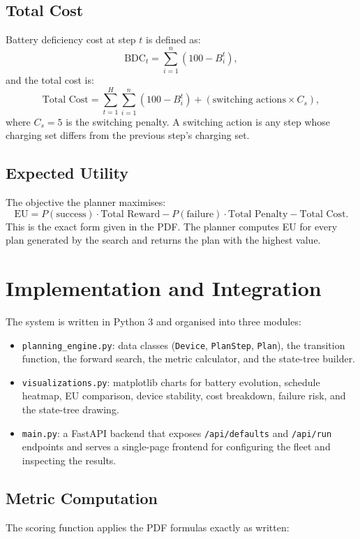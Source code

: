 \documentclass[11pt,a4paper]{article}
\begin{document}
\subsection*{Total Cost}
Battery deficiency cost at step $t$ is defined as:
\[
    \text{BDC}_t = \sum_{i=1}^{n} (100 - B_i^{t}),
\]
and the total cost is:
\[
    \text{Total Cost} = \sum_{t=1}^{H} \sum_{i=1}^{n} (100 - B_i^{t})
                      + (\text{switching actions} \times C_s),
\]
where $C_s = 5$ is the switching penalty. A switching action is any step whose
charging set differs from the previous step's charging set.

\subsection*{Expected Utility}
The objective the planner maximises:
\[
    \text{EU} = P(\text{success}) \cdot \text{Total Reward}
              - P(\text{failure}) \cdot \text{Total Penalty}
              - \text{Total Cost}.
\]
This is the exact form given in the PDF. The planner computes EU for every
plan generated by the search and returns the plan with the highest value.

\section{Implementation and Integration}

The system is written in Python 3 and organised into three modules:

\begin{itemize}[leftmargin=1.3em, itemsep=2pt]
    \item \texttt{planning\_engine.py}: data classes (\texttt{Device},
          \texttt{PlanStep}, \texttt{Plan}), the transition function, the
          forward search, the metric calculator, and the state-tree builder.
    \item \texttt{visualizations.py}: matplotlib charts for battery evolution,
          schedule heatmap, EU comparison, device stability, cost breakdown,
          failure risk, and the state-tree drawing.
    \item \texttt{main.py}: a FastAPI backend that exposes
          \texttt{/api/defaults} and \texttt{/api/run} endpoints and serves a
          single-page frontend for configuring the fleet and inspecting the
          results.
\end{itemize}

\subsection*{Metric Computation}
The scoring function applies the PDF formulas exactly as written:
\end{document}
